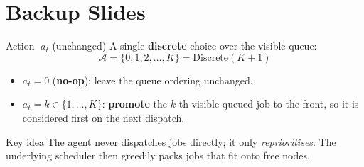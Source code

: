 
\appendix

\section{Backup Slides}

\begin{frame}{Action $\;a_t$ \hfill \small\textcolor{SkyBlue!70!black}{(unchanged)}}
  \small
  A single \textbf{discrete} choice over the visible queue:
  $$ \mathcal{A} = \{0, 1, 2, \dots, K\} = \text{Discrete}(K{+}1) $$
  \begin{itemize}
    \item $a_t = 0$ (\textbf{no-op}): leave the queue ordering unchanged.
    \item $a_t = k \in \{1,\dots,K\}$: \textbf{promote} the $k$-th visible queued
          job to the front, so it is considered first on the next dispatch.
  \end{itemize}
  \begin{block}{Key idea}
    The agent never dispatches jobs directly; it only \emph{reprioritises}.
    The underlying scheduler then greedily packs jobs that fit onto free nodes.
  \end{block}
\end{frame}

